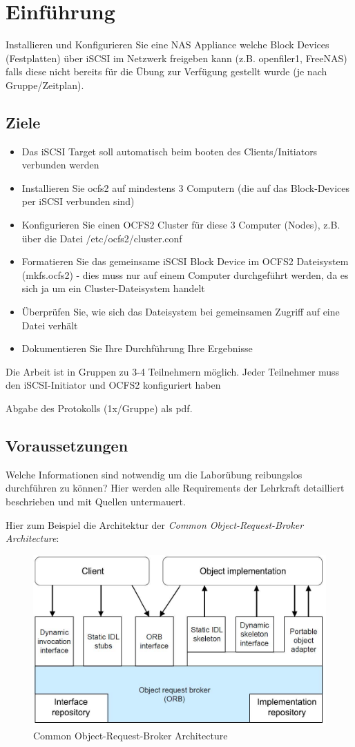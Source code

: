 
\section{Einführung}
Installieren und Konfigurieren Sie eine NAS Appliance welche Block Devices (Festplatten) über iSCSI im Netzwerk freigeben kann (z.B. openfiler1, FreeNAS) falls diese nicht bereits für die Übung zur Verfügung gestellt wurde (je nach Gruppe/Zeitplan).

\subsection{Ziele}


\begin{itemize}
	\item Das iSCSI Target soll automatisch beim booten des Clients/Initiators verbunden werden
	\item Installieren Sie ocfs2 auf mindestens 3 Computern (die auf das Block-Devices per iSCSI verbunden sind)
	\item Konfigurieren Sie einen OCFS2 Cluster für diese 3 Computer (Nodes), z.B. über die Datei /etc/ocfs2/cluster.conf
	\item Formatieren Sie das gemeinsame iSCSI Block Device im OCFS2 Dateisystem (mkfs.ocfs2) - dies muss nur auf einem Computer durchgeführt werden, da es sich ja um ein Cluster-Dateisystem handelt
	\item Überprüfen Sie, wie sich das Dateisystem bei gemeinsamen Zugriff auf eine Datei verhält
	\item Dokumentieren Sie Ihre Durchführung Ihre Ergebnisse
\end{itemize}
Die Arbeit ist in Gruppen zu 3-4 Teilnehmern möglich. Jeder Teilnehmer muss den iSCSI-Initiator und OCFS2 konfiguriert haben

Abgabe des Protokolls (1x/Gruppe) als pdf.

\subsection{Voraussetzungen}
Welche Informationen sind notwendig um die Laborübung reibungslos durchführen zu können? Hier werden alle Requirements der Lehrkraft detailliert beschrieben und mit Quellen untermauert.

Hier zum Beispiel die Architektur der \textit{Common Object-Request-Broker Architecture}:
\begin{figure}[!h]
	\begin{center}
		\includegraphics[width=0.5\linewidth]{images/corba.jpg}
		\caption{Common Object-Request-Broker Architecture \cite{tanenbaum2007verteilte}}
		\label{broker}
	\end{center}
\end{figure}


